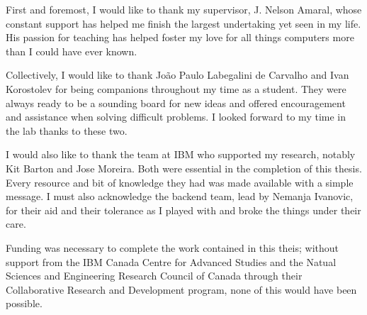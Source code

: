 \documentclass[\main/thesis.tex]{subfiles}
\begin{document}
\begin{acknowledgements}
  First and foremost, I would like to thank my supervisor, J. Nelson Amaral, whose constant support has helped me finish the largest undertaking yet seen in my life.
  His passion for teaching has helped foster my love for all things computers more than I could have ever known.

  Collectively, I would like to thank Jo\~ao Paulo Labegalini de Carvalho and Ivan Korostolev for being companions throughout my time as a student.
  They were always ready to be a sounding board for new ideas and offered encouragement and assistance when solving difficult problems.
  I looked forward to my time in the lab thanks to these two.

  I would also like to thank the team at IBM who supported my research, notably Kit Barton and Jose Moreira.
  Both were essential in the completion of this thesis.
  Every resource and bit of knowledge they had was made available with a simple message.
  I must also acknowledge the backend team, lead by Nemanja Ivanovic, for their aid and their tolerance as I played with and broke the things under their care.

  Funding was necessary to complete the work contained in this theis; without support from the IBM Canada Centre for Advanced Studies and the Natual Sciences and Engineering Research Council of Canada through their Collaborative Research and Development program, none of this would have been possible.
\end{acknowledgements}
\end{document}
